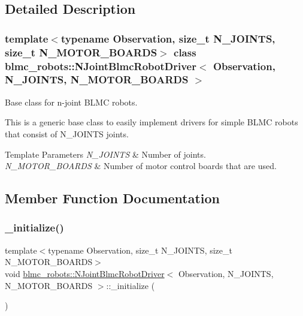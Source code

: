\subsection{Detailed Description}
\subsubsection*{template$<$typename Observation, size\+\_\+t N\+\_\+\+J\+O\+I\+N\+TS, size\+\_\+t N\+\_\+\+M\+O\+T\+O\+R\+\_\+\+B\+O\+A\+R\+DS$>$\newline
class blmc\+\_\+robots\+::\+N\+Joint\+Blmc\+Robot\+Driver$<$ Observation, N\+\_\+\+J\+O\+I\+N\+T\+S, N\+\_\+\+M\+O\+T\+O\+R\+\_\+\+B\+O\+A\+R\+D\+S $>$}

Base class for n-\/joint B\+L\+MC robots. 

This is a generic base class to easily implement drivers for simple B\+L\+MC robots that consist of N\+\_\+\+J\+O\+I\+N\+TS joints.


\begin{DoxyTemplParams}{Template Parameters}
{\em N\+\_\+\+J\+O\+I\+N\+TS} & Number of joints. \\
\hline
{\em N\+\_\+\+M\+O\+T\+O\+R\+\_\+\+B\+O\+A\+R\+DS} & Number of motor control boards that are used. \\
\hline
\end{DoxyTemplParams}


\subsection{Member Function Documentation}
\mbox{\label{classblmc__robots_1_1NJointBlmcRobotDriver_aafa20130f746b5cc35eae43ce36e23c6}} 
\subsubsection{\texorpdfstring{\+\_\+initialize()}{\_initialize()}}
{\footnotesize\ttfamily template$<$typename Observation, size\+\_\+t N\+\_\+\+J\+O\+I\+N\+TS, size\+\_\+t N\+\_\+\+M\+O\+T\+O\+R\+\_\+\+B\+O\+A\+R\+DS$>$ \\
void \hyperlink{classblmc__robots_1_1NJointBlmcRobotDriver}{blmc\+\_\+robots\+::\+N\+Joint\+Blmc\+Robot\+Driver}$<$ Observation, N\+\_\+\+J\+O\+I\+N\+TS, N\+\_\+\+M\+O\+T\+O\+R\+\_\+\+B\+O\+A\+R\+DS $>$\+::\+\_\+initialize (\begin{DoxyParamCaption}{ }\end{DoxyParamCaption})\hspace{0.3cm}{\ttfamily [protected]}}



